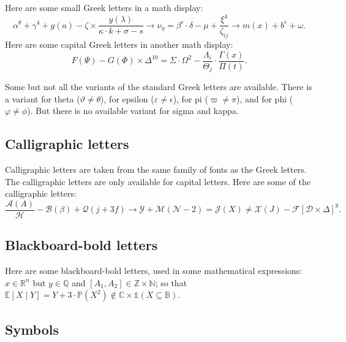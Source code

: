 \documentclass[letterpaper,11pt,leqno]{article}
\begin{document}
Here are some small Greek letters in a math display: 
\begin{equation*}
\alpha^{\theta} + \gamma^4 + g(a) - \zeta \times \frac{y(\lambda)}{\kappa \cdot k+ \sigma - s} \to \nu_{\eta} = \beta^\epsilon \cdot \delta - \mu + \frac{\xi^4}{\zeta_{ij}} \to m(x) + b^e + \omega .
\end{equation*}
Here are some capital Greek letters in another math display: 
\begin{equation}
F(\Psi) - G(\Phi) \times \Delta^{10} = \Sigma \cdot \Omega^2 - \frac{\Lambda_i}{\Theta_j} \cdot \frac{\Gamma(x)}{\Pi(t)}.
\label{e:capitalgreek}\end{equation}

Some but not all the variants of the standard Greek letters are available. There is a variant for theta ($\vartheta \neq \theta$), for epsilon ($\varepsilon \neq \epsilon$), for pi ($\varpi \neq \pi$), and for phi ($\varphi \neq \phi$). But there is no available variant for sigma and kappa.

\subsection{Calligraphic letters} 

Calligraphic letters are taken from the same family of fonts as the Greek letters. The calligraphic letters are only available for capital letters. Here are some of the calligraphic letters: 
\begin{equation*}
\frac{\mathcal{A}(A)}{\mathcal{H}} - \mathcal{B}(\beta) + \mathcal{Q}(j+3f) \to \mathcal{Y} + \mathcal{M}(\mathcal{N} - 2) = \mathcal{J}(X) \neq \mathcal{X}(J) - \mathcal{F}[\mathcal{D} \times \Delta]^8. 
\end{equation*}

\subsection{Blackboard-bold letters} 

Here are some blackboard-bold letters, used in some mathematical expressions: $x \in\mathbb{R}^n$ but $y\in \mathbb{Q}$ and $[A_1,A_2] \in \mathbb{Z} \times \mathbb{N}$; so that $\mathbb{E}[X\mid Y] = Y + 3 \cdot \mathbb{P}(X^2) \notin \mathbb{C} \times \mathbb{1}(X \subseteq \mathbb{B})$.

\subsection{Symbols} 
\end{document}
